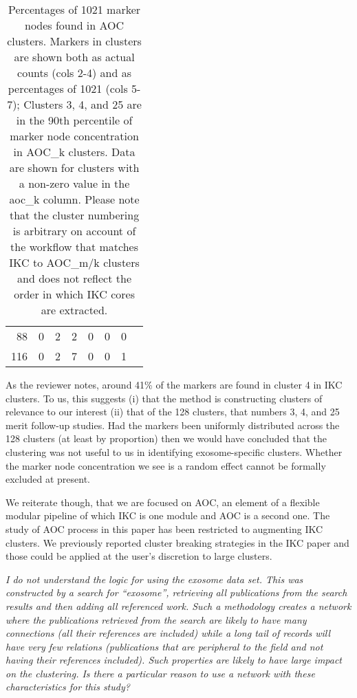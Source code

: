 \documentclass[11pt, oneside]{article}   	%
\begin{document}
\begin{table}[ht]
\begin{tabular}{rrrrrrrr}
88 & 0 &   2 &   2 &   0 &   0 &   0 \\ 
116 & 0 &  2 &   7 &   0 &   0 &   1 \\ 
   \hline
\end{tabular}
\caption{Percentages of 1021 marker nodes found in AOC clusters. Markers in clusters are shown both as actual counts (cols 2-4) and as percentages of 1021 (cols 5-7); Clusters 3, 4, and 25 are in the 90th percentile of marker node concentration in AOC\_k clusters. Data are shown for clusters with a non-zero value in the aoc\_k column. Please note that the cluster numbering is arbitrary on account of the workflow that matches IKC to AOC\_m/k clusters and does not reflect the order in which IKC cores are extracted. }
\end{table}

As the reviewer notes, around 41\% of the markers are found in cluster 4 in IKC clusters. To us, this suggests (i) that the method is constructing clusters of relevance to our interest
(ii) that of the 128 clusters, that numbers 3, 4, and 25 merit follow-up studies. Had the markers been uniformly distributed across the 128 clusters (at least by proportion) then we
would have concluded that the clustering was not useful to us in identifying exosome-specific clusters. Whether the marker node concentration we see is a random effect cannot be formally excluded at present.

We reiterate though, that we are focused on AOC, an element of a flexible modular pipeline of which IKC is one module and AOC is a second one. The study of AOC process in this paper has been restricted 
to augmenting IKC clusters. We previously reported cluster breaking strategies in the IKC paper and those could be applied at the user's discretion to large clusters.

\emph{I do not understand the logic for using the exosome data set. This was constructed by a search for “exosome”, retrieving all publications from the search results and then adding all referenced work. Such a methodology creates a network where the publications retrieved from the search are likely to have many connections (all their references are included) while a long tail of records will have very few relations (publications that are peripheral to the field and not having their references included). Such properties are likely to have large impact on the clustering. Is there a particular reason to use a network with these characteristics for this study?}
\end{document}
